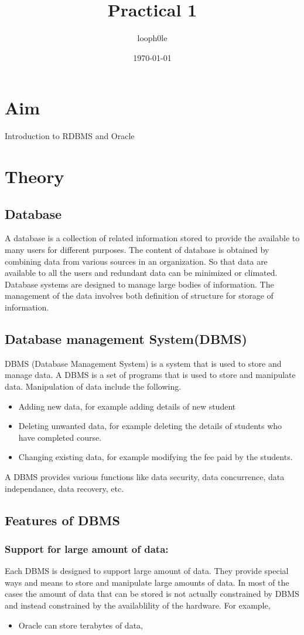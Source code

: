 \documentclass[11pt]{article}
\author{looph0le}
\date{\today}
\title{Practical 1}
\begin{document}
\maketitle
\tableofcontents


\section{Aim}
\label{sec:orge15c5b7}
Introduction to RDBMS and Oracle
\section{Theory}
\label{sec:org4a4102c}
\subsection{Database}
\label{sec:orgd8554db}
A database is a collection of related information stored to provide the available to many users for different purposes.
The content of database is obtained by combining data from various sources in an organization. So that data are available to all the users
and redundant data can be minimized or climated. Database systems are designed to manage large bodies of information.
The management of the data involves both definition of structure for storage of information.
\subsection{Database management System(DBMS)}
\label{sec:orge148ce3}
DBMS (Database Management System) is a system that is used to store and manage data.
A DBMS is a set of programs that is used to store and manipulate data. Manipulation of data include the following.
\begin{itemize}
\item Adding new data, for example adding details of new student
\item Deleting unwanted data, for example deleting the details of students who have completed course.
\item Changing existing data, for example modifying the fee paid by the students.
\end{itemize}
A DBMS provides various functions like data security, data concurrence, data independance, data recovery, etc.
\subsection{Features of DBMS}
\label{sec:org98f9834}
\subsubsection{Support for large amount of data:}
\label{sec:org2737150}
Each DBMS is designed to support large amount of data. They provide special ways and means to store and manipulate large amounts of data. In most of the cases the amount of data that can be stored is not actually constrained by DBMS and instead constrained by the availablility of the hardware.
For example,
\begin{itemize}
\item Oracle can store terabytes of data,
\end{itemize}
\end{document}
